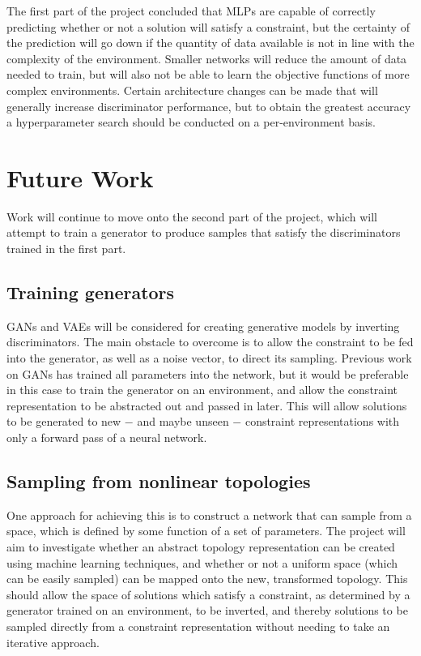 \documentclass[a4paper]{article}
\begin{document}
The first part of the project concluded that MLPs are capable of correctly predicting whether or not a solution will satisfy a constraint,
but the certainty of the prediction will go down if the quantity of data available is not in line with the complexity of the environment.
Smaller networks will reduce the amount of data needed to train, but will also not be able to learn the objective functions of more complex environments.
Certain architecture changes can be made that will generally increase discriminator performance,
but to obtain the greatest accuracy a hyperparameter search should be conducted on a per-environment basis.

\section{Future Work}

Work will continue to move onto the second part of the project, which will attempt to train a generator to
produce samples that satisfy the discriminators trained in the first part.

\subsection{Training generators}

GANs and VAEs will be considered for creating generative models by inverting discriminators.
The main obstacle to overcome is to allow the constraint to be fed into the generator, as well as a noise vector, to direct its sampling.
Previous work on GANs has trained all parameters into the network, but it would be preferable in this case to train the
generator on an environment, and allow the constraint representation to be abstracted out and passed in later.
This will allow solutions to be generated to new $-$ and maybe unseen $-$ constraint representations with only a forward pass of a neural network.

\subsection{Sampling from nonlinear topologies}

One approach for achieving this is to construct a network that can sample from a space, which is defined by some function of a set of parameters.
The project will aim to investigate whether an abstract topology representation can be created using machine learning techniques,
and whether or not a uniform space (which can be easily sampled) can be mapped onto the new, transformed topology.
This should allow the space of solutions which satisfy a constraint, as determined by a generator trained on an environment,
to be inverted, and thereby solutions to be sampled directly from a constraint representation without needing
to take an iterative approach.
\end{document}
